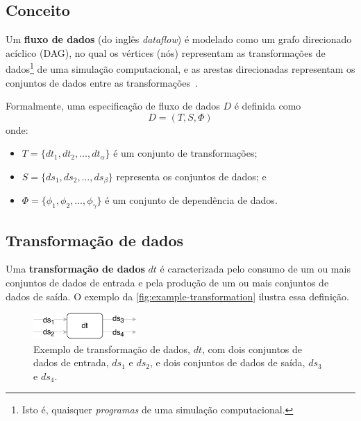 
\subsection{Conceito}

Um \textbf{fluxo de dados} (do inglês \textit{dataflow}) é modelado como um grafo direcionado acíclico (DAG), no qual os vértices (nós) representam as transformações de dados\footnote{Isto é, quaisquer \emph{programas} de uma simulação computacional.} de uma simulação computacional, e as arestas direcionadas representam os conjuntos de dados entre as transformações~\cite{silva2017raw}.

Formalmente, uma especificação de fluxo de dados \( D \) é definida como \[ D = (T, S, \Phi) \] onde:
\begin{itemize}
    \item \( T = \{dt_1, dt_2, \ldots, dt_{\alpha}\} \) é um conjunto de transformações;
    \item \( S = \{ds_1, ds_2, \ldots, ds_{\beta}\} \) representa os conjuntos de dados; e
    \item \( \Phi = \{\phi_1, \phi_2, \ldots, \phi_{\gamma}\} \) é um conjunto de dependência de dados.
\end{itemize}

\subsection{Transformação de dados}

Uma \textbf{transformação de dados} \( dt \) é caracterizada pelo consumo de um ou mais conjuntos de dados de entrada e pela produção de um ou mais conjuntos de dados de saída. O exemplo da \autoref{fig:example-transformation} ilustra essa definição.

\begin{figure}[htb]
    \centering
    \includegraphics[width=0.35\textwidth]{img/example-data-transformation}
    \caption[Exemplo de transformação de dados]{Exemplo de transformação de dados, \( dt \), com dois conjuntos de dados de entrada, \( ds_1 \) e \( ds_2 \), e dois conjuntos de dados de saída, \( ds_3 \) e \( ds_4 \).}%
    \label{fig:example-transformation}
\end{figure}

